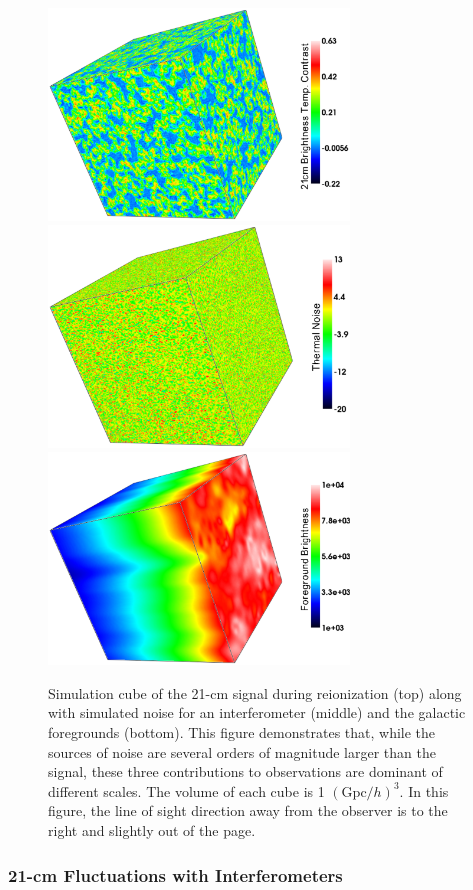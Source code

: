 \begin{figure}[h]
  \centering
  \includegraphics[width=8cm]{TalkSignal.eps}
  \includegraphics[width=8cm]{TalkNoise.eps}
  \includegraphics[width=8cm]{TalkFG.eps}
  \caption{Simulation cube of the 21-cm signal during reionization (top) along with simulated noise for an interferometer (middle) and the galactic foregrounds (bottom). This figure demonstrates that, while the sources of noise are several orders of magnitude larger than the signal, these three contributions to observations are dominant of different scales. The volume of each cube is 1 $(\text{Gpc}/h)^{3}$. In this figure, the line of sight direction away from the observer is to the right and slightly out of the page. }
  \label{fig:21cmCube}
\end{figure}


\subsubsection{21-cm Fluctuations with Interferometers} 


